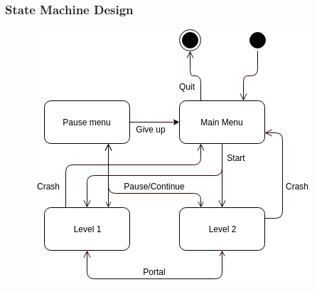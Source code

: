 \begin{frame}
    \frametitle{State Machine Design}
    \begin{figure}
      \begin{center}
        \includegraphics[height=0.7\textheight]{StateMachine.png}
      \end{center}
    \end{figure}
\end{frame}
